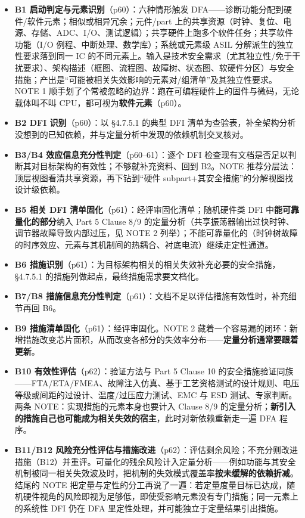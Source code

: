 \begin{itemize}
\item \textbf{B1 启动判定与元素识别}（p60）：六种情形触发 DFA——诊断功能分配到硬件/软件元素；相似或相异冗余；元件/part 上的共享资源（时钟、复位、电源、存储、ADC、I/O、测试逻辑）；共享硬件上跑多个软件任务；共享软件功能（I/O 例程、中断处理、数学库）；系统或元素级 ASIL 分解派生的独立性要求落到同一 IC 的不同元素上。输入是技术安全需求（尤其独立性/免于干扰要求）、架构描述（框图、流程图、故障树、状态图、软硬件分区）与安全措施；产出是“可能被相关失效影响的元素对/组清单”及其独立性要求。NOTE 1 顺手划了个常被忽略的边界：跑在可编程硬件上的固件与微码，无论载体叫不叫 CPU，都可视为\textbf{软件元素}（p60）。
\item \textbf{B2 DFI 识别}（p60）：以 §4.7.5.1 的典型 DFI 清单为查验表，补全架构分析没想到的已知依赖，并与定量分析中发现的依赖机制交叉核对。
\item \textbf{B3/B4 效应信息充分性判定}（p60–61）：逐个 DFI 检查现有文档是否足以判断其对目标架构的有效性；不够就补充资料、回到 B2。NOTE 推荐分层法：顶层视图看清共享资源，再下钻到“硬件 subpart+其安全措施”的分解视图找设计级依赖。
\item \textbf{B5 相关 DFI 清单固化}（p61）：经评审固化清单；随机硬件类 DFI 中\textbf{能可靠量化的部分}纳入 Part 5 Clause 8/9 的定量分析（共享振荡器输出过快时钟、调节器故障导致内部过压，见 NOTE 2 列举）；不能可靠量化的（时钟树故障的时序效应、元素与其机制间的热耦合、衬底电流）继续走定性通道。
\item \textbf{B6 措施识别}（p61）：为目标架构相关的相关失效补充必要的安全措施，§4.7.5.1 的措施列做起点，最终措施需求要文档化。
\item \textbf{B7/B8 措施信息充分性判定}（p61）：文档不足以评估措施有效性时，补充细节再回 B6。
\item \textbf{B9 措施清单固化}（p61）：经评审固化。NOTE 2 藏着一个容易漏的闭环：新增措施改变芯片面积，从而改变各部分的失效率分布——\textbf{定量分析通常要跟着更新}。
\item \textbf{B10 有效性评估}（p62）：验证方法与 Part 5 Clause 10 的安全措施验证同族——FTA/ETA/FMEA、故障注入仿真、基于工艺资格测试的设计规则、电压等级或间距的过设计、温度/过压应力测试、EMC 与 ESD 测试、专家判断。两条 NOTE：实现措施的元素本身也要计入 Clause 8/9 的定量分析；\textbf{新引入的措施自己也可能成为相关失效的宿主}，此时对新依赖重新走一遍 DFA 程序。
\item \textbf{B11/B12 风险充分性评估与措施改进}（p62）：评估剩余风险；不充分则改进措施（B12）并重评。可量化的残余风险计入定量分析——例如功能与其安全机制被同一相关失效波及时，把机制的失效模式覆盖率\textbf{按未缓解的依赖折减}。结尾的 NOTE 把定量与定性的分工再说了一遍：若定量度量目标已达成，随机硬件视角的风险即视为足够低，即使受影响元素没有专门措施；同一元素上的系统性 DFI 仍在 DFA 里定性处理，并可能独立于定量结果引出措施。
\end{itemize}

